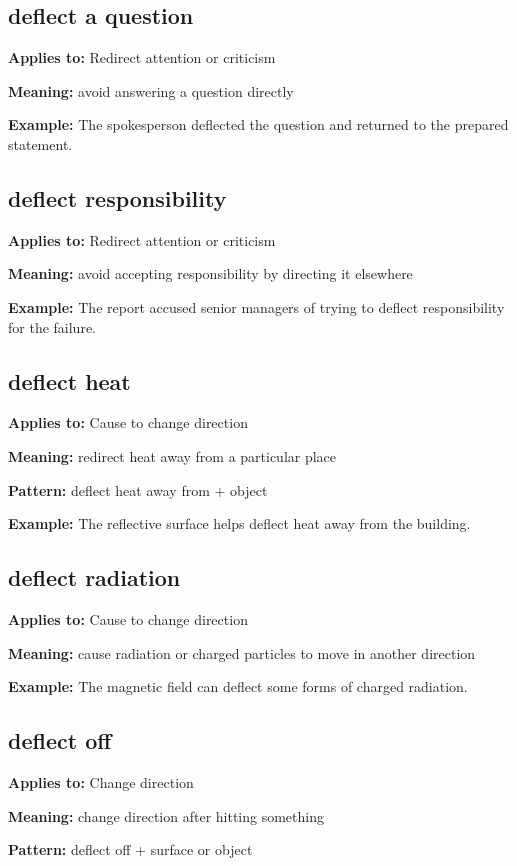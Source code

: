 \documentclass[11pt]{article}
\begin{document}
\subsection{deflect a question}
\textbf{Applies to:} Redirect attention or criticism

\textbf{Meaning:} avoid answering a question directly

\textbf{Example:} The spokesperson deflected the question and returned to the prepared statement.

\subsection{deflect responsibility}
\textbf{Applies to:} Redirect attention or criticism

\textbf{Meaning:} avoid accepting responsibility by directing it elsewhere

\textbf{Example:} The report accused senior managers of trying to deflect responsibility for the failure.

\subsection{deflect heat}
\textbf{Applies to:} Cause to change direction

\textbf{Meaning:} redirect heat away from a particular place

\textbf{Pattern:} deflect heat away from + object

\textbf{Example:} The reflective surface helps deflect heat away from the building.

\subsection{deflect radiation}
\textbf{Applies to:} Cause to change direction

\textbf{Meaning:} cause radiation or charged particles to move in another direction

\textbf{Example:} The magnetic field can deflect some forms of charged radiation.

\subsection{deflect off}
\textbf{Applies to:} Change direction

\textbf{Meaning:} change direction after hitting something

\textbf{Pattern:} deflect off + surface or object
\end{document}
